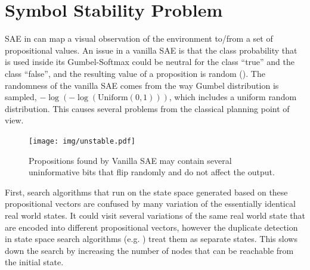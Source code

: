 

\section{Symbol Stability Problem}
\label{issues}

SAE in \latentplanner can map a visual observation of the environment to/from a set of propositional values.
An issue in a vanilla SAE is that the class probability that is used inside its Gumbel-Softmax could be
neutral for the class ``true'' and the class ``false'', and the resulting value
of a proposition is random ().
The randomness of the vanilla SAE comes from the way
Gumbel distribution is sampled, $-\log (-\log (\text{Uniform}(0,1)))$, which includes
a uniform random distribution.
This causes several problems from the classical planning point of view.

\begin{figure}[htb]
 \centering
 \texttt{[image: img/unstable.pdf]}
 \caption{Propositions found by Vanilla SAE may contain several uninformative bits
 that flip randomly and do not affect the output.}
 \label{unstable}
\end{figure}

First, search algorithms that run on the state space generated based on these propositional vectors
are confused by many variation of the essentially identical real world states.
It could visit several variations of the same real world state that are encoded into different propositional vectors,
however the duplicate detection in state space search algorithms (e.g. \astar) treat them as separate states.
This slows down the search by increasing the number of nodes that can be reachable from the initial state.

